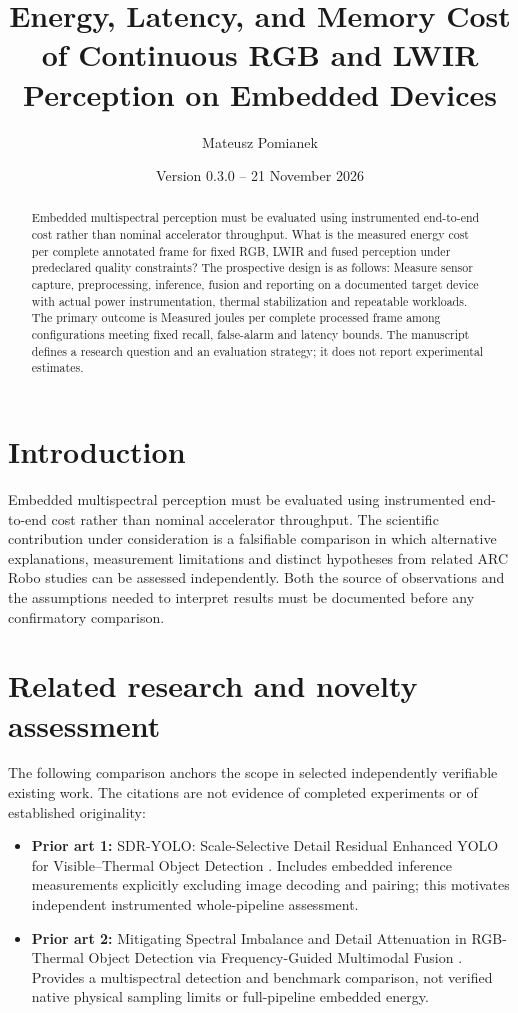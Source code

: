 \documentclass[11pt,a4paper]{article}
\title{Energy, Latency, and Memory Cost of Continuous RGB and LWIR Perception on Embedded Devices}
\author{Mateusz Pomianek}
\date{Version 0.3.0 -- 21 November 2026}
\begin{document}
\maketitle

\begin{abstract}
Embedded multispectral perception must be evaluated using instrumented end-to-end cost rather than nominal accelerator throughput. What is the measured energy cost per complete annotated frame for fixed RGB, LWIR and fused perception under predeclared quality constraints? The prospective design is as follows: Measure sensor capture, preprocessing, inference, fusion and reporting on a documented target device with actual power instrumentation, thermal stabilization and repeatable workloads. The primary outcome is Measured joules per complete processed frame among configurations meeting fixed recall, false-alarm and latency bounds. The manuscript defines a research question and an evaluation strategy; it does not report experimental estimates.
\end{abstract}

\section{Introduction}
Embedded multispectral perception must be evaluated using instrumented end-to-end cost rather than nominal accelerator throughput. The scientific contribution under consideration is a falsifiable comparison in which alternative explanations, measurement limitations and distinct hypotheses from related ARC Robo studies can be assessed independently. Both the source of observations and the assumptions needed to interpret results must be documented before any confirmatory comparison.

\section{Related research and novelty assessment}
The following comparison anchors the scope in selected independently verifiable existing work. The citations are not evidence of completed experiments or of established originality:
\begin{itemize}
\item \textbf{Prior art 1:} SDR-YOLO: Scale-Selective Detail Residual Enhanced YOLO for Visible--Thermal Object Detection \cite{source1}. Includes embedded inference measurements explicitly excluding image decoding and pairing; this motivates independent instrumented whole-pipeline assessment.
\item \textbf{Prior art 2:} Mitigating Spectral Imbalance and Detail Attenuation in RGB-Thermal Object Detection via Frequency-Guided Multimodal Fusion \cite{source2}. Provides a multispectral detection and benchmark comparison, not verified native physical sampling limits or full-pipeline embedded energy.
\end{itemize}
\end{document}
